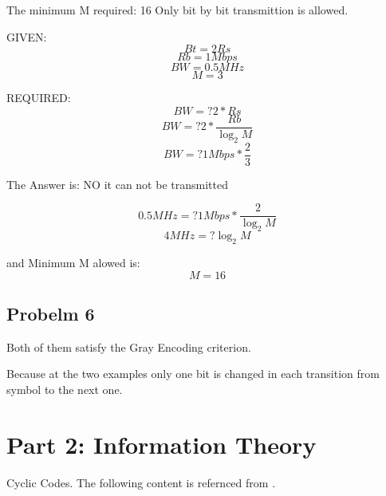 \documentclass[a4paper,12pt]{report}
\begin{document}
        The minimum M required: 16
        Only bit by bit transmittion is allowed.

        GIVEN:
        \begin{equation*}
            Bt = 2Rs
        \end{equation*}
        \begin{equation*}
            Rb = 1 Mbps
        \end{equation*}
        \begin{equation*}
            BW = 0.5 MHz
        \end{equation*}
        \begin{equation*}
            M = 3
        \end{equation*}

        REQUIRED:
        \begin{equation*}
            BW =? 2 * Rs
        \end{equation*}
        \begin{equation*}
            BW =? 2 * \frac{Rb}{\log_2 M}
        \end{equation*}
        \begin{equation*}
            BW =? 1Mbps * \frac{2}{3}
        \end{equation*}

        The Answer is: NO it can not be transmitted
        
        \begin{equation*}
            0.5MHz =? 1Mbps * \frac{2}{\log_2 M}
        \end{equation*}
        \begin{equation*}
            4MHz =? \log_2 M
        \end{equation*}

        and Minimum M alowed is:
        \begin{equation*}
            M = 16
        \end{equation*}
        
    \subsection{Probelm 6}
        Both of them satisfy the Gray Encoding criterion.

        Because at the two examples only one bit is changed in each transition from symbol to the next one.

    \newpage

    \section{Part 2: Information Theory}
        Cyclic Codes.
        The following content is refernced from \cite{ref1,ref2}.
\end{document}
